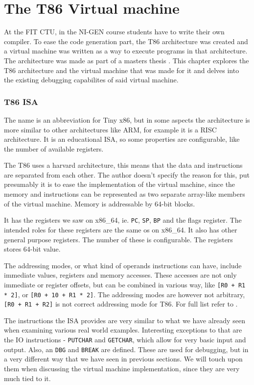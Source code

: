 \chapter{The T86 Virtual machine}
At the FIT CTU, in the NI-GEN course students have to write their own compiler.
To ease the code generation part, the T86 architecture was created and a
virtual machine was written as a way to execute programs in that architecture.
The architecture was made as part of a masters thesis \cite{ivo2021tiny}. This
chapter explores the T86 architecture and the virtual machine that was made for
it and delves into the existing debugging capabilites of said virtual machine.

\subsection{T86 ISA}
The name is an abbreviation for Tiny x86, but in some aspects the architecture
is more similar to other architectures like ARM, for example it is a RISC
architecture. It is an educational ISA, so some properties are configurable,
like the number of available registers.

The T86 uses a harvard architecture, this means that the data and instructions
are separated from each other. The author doesn't specify the reason for this,
put presumably it is to ease the implementation of the virtual machine, since
the memory and instructions can be represented as two separate array-like
members of the virtual machine. Memory is addressable by 64-bit blocks.

It has the registers we saw on x86\_64, ie. \texttt{PC}, \texttt{SP},
\texttt{BP} and the flags register. The intended roles for these registers are
the same os on x86\_64. It also has other general purpose registers. The number
of these is configurable. The registers stores 64-bit value.

The addressing modes, or what kind of operands instructions can have, include
immediate values, registers and memory accesses. These accesses are not only
immediate or register offsets, but can be combined in various way, like
\texttt{[R0 + R1 * 2]}, or \texttt{[R0 + 10 + R1 * 2]}. The addressing modes
are however not arbitrary, \texttt{[R0 + R1 + R2]} is not correct addressing
mode for T86. For full list refer to \cite{ivo2021tiny}.

The instructions the ISA provides are very similar to what we have already seen
when examining various real world examples. Interesting exceptions to that are
the IO instructions - \texttt{PUTCHAR} and \texttt{GETCHAR}, which allow for
very basic input and output. Also, an \texttt{DBG} and \texttt{BREAK} are
defined. These are used for debugging, but in a very different way that we have
seen in previous sections. We will touch upon them when discussing the virtual
machine implementation, since they are very much tied to it.

